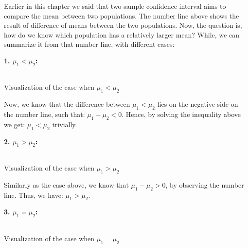 Earlier in this chapter we said that two sample confidence interval aims to compare the mean between two populations. The number line above shows the result of difference of means between the two populations. Now, the question is, how do we know which population has a relatively larger mean? While, we can summarize it from that number line, with different cases:

\textbf{1. $\mu_1 < \mu_2$:}

\begin{center}
\vspace{0.5em}
\small\textbf{}\\Visualization of the case when $\mu_1 < \mu_2$
\end{center}

Now, we know that the difference between $\mu_1 < \mu_2$ lies on the negative side on the number line, such that: $\mu_1 - \mu_2 < 0$. Hence, by solving the inequality above we get: $\mu_1 < \mu_2$ trivially.

\textbf{2. $\mu_1 > \mu_2$:}

\begin{center}
\vspace{0.5em}
\small\textbf{}\\Visualization of the case when $\mu_1 > \mu_2$
\end{center}

Similarly as the case above, we know that $\mu_1 - \mu_2 > 0$, by observing the number line. Thus, we have: $\mu_1 > \mu_2$.

\textbf{3. $\mu_1 = \mu_2$:}

\begin{center}
\vspace{0.5em}
\small\textbf{}\\Visualization of the case when $\mu_1 = \mu_2$
\end{center}

